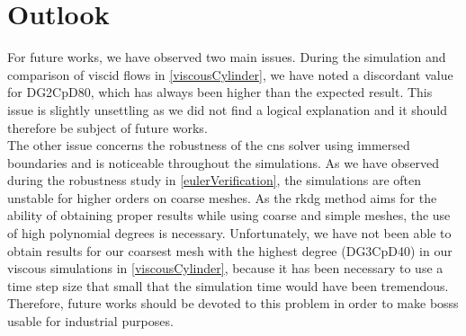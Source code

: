 \section{Outlook}
For future works, we have observed two main issues. During the simulation and comparison of viscid flows in \cref{viscousCylinder}, we have noted a discordant value for DG2CpD80, which has always been higher than the expected result. This issue is slightly unsettling as we did not find a logical explanation and it should therefore be subject of future works. \\\indent
The other issue concerns the robustness of the \gls{cns} solver using immersed boundaries and is noticeable throughout the simulations. As we have observed during the robustness study in \cref{eulerVerification}, the simulations are often unstable for higher orders on coarse meshes. As the \gls{rkdg} method aims for the ability of obtaining proper results while using coarse and simple meshes, the use of high polynomial degrees is necessary. Unfortunately, we have not been able to obtain results for our coarsest mesh with the highest degree (DG3CpD40) in our viscous simulations in \cref{viscousCylinder}, because it has been necessary to use a time step size that small that the simulation time would have been tremendous. Therefore, future works should be devoted to this problem in order to make \gls{bosss} usable for industrial purposes. 

